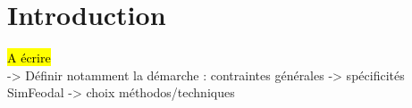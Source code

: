 \clearpage
\section*{Introduction}
\hl{A écrire}\\
-> Définir notamment la démarche : contraintes générales -> spécificités SimFeodal -> choix méthodos/techniques